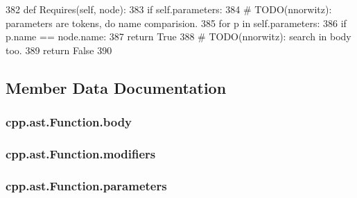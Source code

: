 \begin{DoxyCode}
382     \textcolor{keyword}{def }Requires(self, node):
383         \textcolor{keywordflow}{if} self.parameters:
384             \textcolor{comment}{# TODO(nnorwitz): parameters are tokens, do name comparision.}
385             \textcolor{keywordflow}{for} p \textcolor{keywordflow}{in} self.parameters:
386                 \textcolor{keywordflow}{if} p.name == node.name:
387                     \textcolor{keywordflow}{return} \textcolor{keyword}{True}
388         \textcolor{comment}{# TODO(nnorwitz): search in body too.}
389         \textcolor{keywordflow}{return} \textcolor{keyword}{False}
390 
\end{DoxyCode}


\subsection{Member Data Documentation}
\subsubsection[{\texorpdfstring{body}{body}}]{\setlength{\rightskip}{0pt plus 5cm}cpp.\+ast.\+Function.\+body}\hypertarget{classcpp_1_1ast_1_1Function_a8e25e5016b23b38e32acf2df529c0650}{}\label{classcpp_1_1ast_1_1Function_a8e25e5016b23b38e32acf2df529c0650}
\subsubsection[{\texorpdfstring{modifiers}{modifiers}}]{\setlength{\rightskip}{0pt plus 5cm}cpp.\+ast.\+Function.\+modifiers}\hypertarget{classcpp_1_1ast_1_1Function_ad30eed435f1ff9ff34ade9cc0d7be121}{}\label{classcpp_1_1ast_1_1Function_ad30eed435f1ff9ff34ade9cc0d7be121}
\subsubsection[{\texorpdfstring{parameters}{parameters}}]{\setlength{\rightskip}{0pt plus 5cm}cpp.\+ast.\+Function.\+parameters}\hypertarget{classcpp_1_1ast_1_1Function_a0e61ef47af9cf2fd4402dbd8cab631ef}{}\label{classcpp_1_1ast_1_1Function_a0e61ef47af9cf2fd4402dbd8cab631ef}
